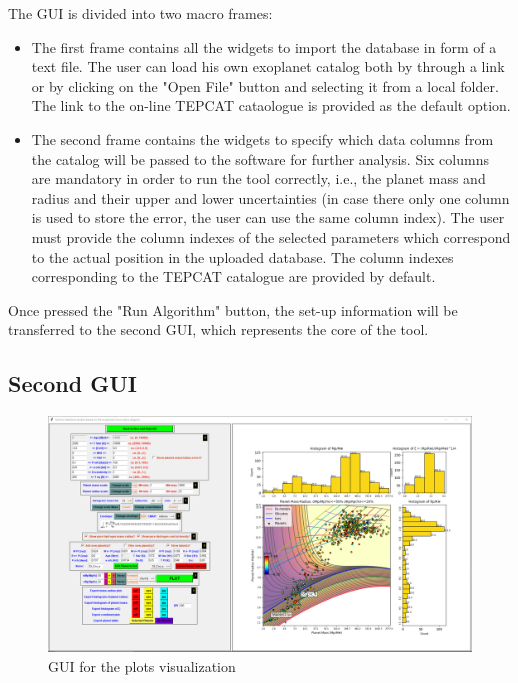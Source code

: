 \documentclass[fleqn,10pt]{SelfArx} %
\begin{document}
            The GUI is divided into two macro frames:
            \begin{itemize}
                \item The first frame contains all the widgets to import the database in form of a text file. The user can load his own exoplanet catalog both by through a link or by clicking on the "Open File" button and selecting it from a local folder. The link to the on-line TEPCAT cataologue \textit{\cite{Southworth2011}} is provided as the default option.
                \item  The second frame contains the widgets to specify which data columns from the catalog will be passed to the software for further analysis.
                Six columns are mandatory in order to run the tool correctly, i.e., the planet mass and radius and their upper and lower uncertainties (in case there only one column is used to store the error, the user can use the same column index).
                The user must provide the column indexes of the selected parameters which correspond to the actual position in the uploaded database.
                The column indexes corresponding to the TEPCAT catalogue are provided by default.
            \end{itemize}

            Once pressed the "Run Algorithm" button, the set-up information will be transferred to the second GUI, which represents the core of the tool.

	    \subsection{Second GUI}

	        \begin{figure}[ht]\centering %
            	\includegraphics[width=\linewidth]{pictures/Manipulate_Planet_Code.PNG}
            	\caption{GUI for the plots visualization}
            	\label{fig:GUI2}
            \end{figure}
\end{document}
